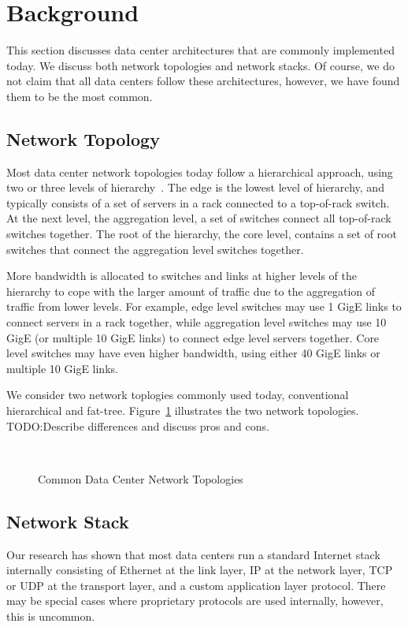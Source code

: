 \section{Background}
\label{sec:background}

This section discusses data center architectures that are commonly implemented today.  We discuss both network topologies and network stacks.  Of course, we do not claim that all data centers follow these architectures, however, we have found them to be the most common.

\subsection {Network Topology}

Most data center network topologies today follow a hierarchical approach, using two or three levels of hierarchy~\cite{Al-Fares:2008:SCD}.  The edge is the lowest level of hierarchy, and typically consists of a set of servers in a rack connected to a top-of-rack switch.  At the next level, the aggregation level, a set of switches connect all top-of-rack switches together.  The root of the hierarchy, the core level, contains a set of root switches that connect the aggregation level switches together.  

More bandwidth is allocated to switches and links at higher levels of the hierarchy to cope with the larger amount of traffic due to the aggregation of traffic from lower levels.  For example, edge level switches may use 1 GigE links to connect servers in a rack together, while aggregation level switches may use 10 GigE (or multiple 10 GigE links) to connect edge level servers together.  Core level switches may have even higher bandwidth, using either 40 GigE links or multiple 10 GigE links.

We consider two network toplogies commonly used today, conventional hierarchical and fat-tree.  Figure~\ref{fig:common_topos} illustrates the two network topologies.  TODO:Describe differences and discuss pros and cons.

\begin{figure}
    \centering
    \\
    \caption{Common Data Center Network Topologies}
    \label{fig:common_topos}
\end{figure}


\subsection {Network Stack}

Our research has shown that most data centers run a standard Internet stack internally consisting of Ethernet at the link layer, IP at the network layer, TCP or UDP at the transport layer, and a custom application layer protocol.  There may be special cases where proprietary protocols are used internally, however, this is uncommon.
